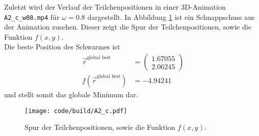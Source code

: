 Zuletzt wird der Verlauf der Teilchenpositionen in einer 3D-Animation \texttt{A2\_c\_w08.mp4} für $\omega=0.8$ dargestellt.
In Abbildung \ref{fig:A2_c} ist ein Schnappschuss aus der Animation zusehen.
Dieser zeigt die Spur der Teilchenpositionen, sowie die Funktion $f(x, y)$.
\\
Die beste Position des Schwarmes ist
\begin{align}
    \vec{r}^\text{global best} &= \begin{pmatrix}
        1.67055 \\
        2.06245
    \end{pmatrix}\\
    f(\vec{r}^\text{global best}) &= -4.94241
\end{align}
und stellt somit das globale Minimum dar.
\begin{figure}
    \centering
    \texttt{[image: code/build/A2\_c.pdf]}
    \caption{Spur der Teilchenpositionen, sowie die Funktion $f(x, y)$.}
    \label{fig:A2_c}
\end{figure}